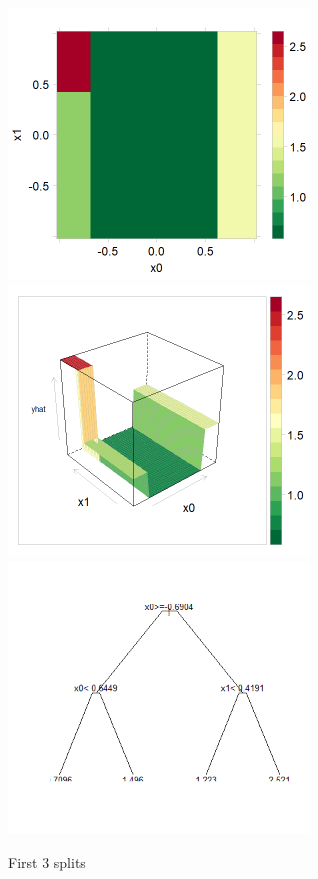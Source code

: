\documentclass[10pt,openany]{article}
\numberwithin{definition}{section}
\numberwithin{example}{section}
\numberwithin{equation}{section}
\numberwithin{figure}{section}
\begin{document}
\begin{figure}
\noindent \begin{centering}
\includegraphics[width=80mm]{../fig/rpart-3-split-levelplot}~
\includegraphics[width=80mm]{../fig/rpart-3-split-wireframe}~
\includegraphics[width=80mm]{../fig/rpart-3-split-tree}
\par\end{centering}

\protect\caption{\label{fig:3-spits}First 3 splits}
\end{figure}
\end{document}
